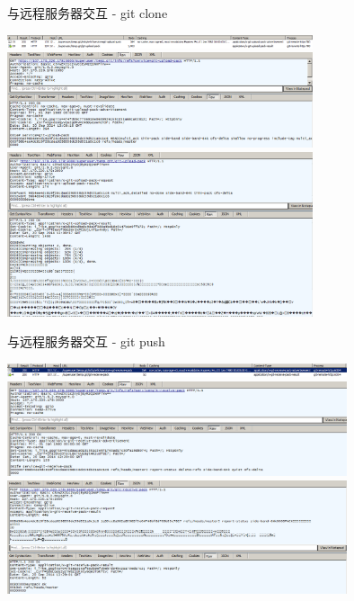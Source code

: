 \documentclass[CJK, 10pt]{beamer}
\begin{document}
\begin{CJK*}{UTF8}{gbsn}
\begin{frame}{与远程服务器交互 - git clone}
    \begin{center}
        \includegraphics[width=9cm]{git-clone-remote-1.png} \\
        \includegraphics[width=9cm]{git-clone-remote-2.png} \\
        \includegraphics[width=9cm]{git-clone-remote-3.png}
    \end{center}
\end{frame}
\begin{frame}{与远程服务器交互 - git push}
    \begin{center}
        \includegraphics[width=10cm]{git-push-remote-1.png} \\
        \includegraphics[width=10cm]{git-push-remote-2.png} \\
        \includegraphics[width=10cm]{git-push-remote-3.png} \\

\end{center}
\end{frame}
\end{CJK*}
\end{document}
